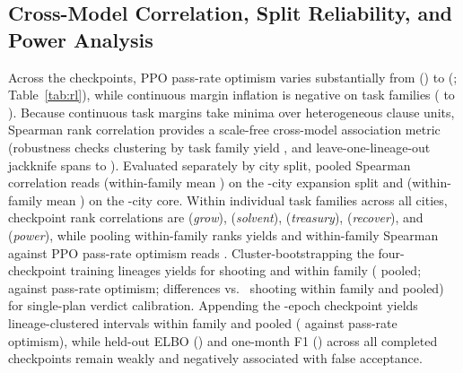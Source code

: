 \ifAcrossDone
\subsection{Cross-Model Correlation, Split Reliability, and Power Analysis}\label{app:acrossmore}

Across the \RlCkptsDone{} checkpoints, PPO pass-rate optimism varies substantially from \RlGapMin{} (\RlGapMinCkpt{}) to \RlGapMax{} (\RlGapMaxCkpt{}; Table~\ref{tab:rl}), while continuous margin inflation is negative on \AcInflNegN{} task families (\AcInflNegMin{} to \AcInflNegMax{}). Because continuous task margins take minima over heterogeneous clause units, Spearman rank correlation provides a scale-free cross-model association metric (robustness checks clustering by task family yield \AcRhoFamCI{}, and leave-one-lineage-out jackknife spans \AcLoloMin{} to \AcLoloMax{}). Evaluated separately by city split, pooled Spearman correlation reads \AcEightyRho{} \ci{\AcEightyRhoCI} (within-family mean \AcEightyWithin{}) on the \XCities-city expansion split and \AcFortyRho{} \ci{\AcFortyRhoCI} (within-family mean \AcFortyWithin{}) on the \HeldOutFamilies-city core. Within individual task families across all \AllCities{} cities, checkpoint rank correlations are \AcFamGrowRho{} \ci{\AcFamGrowRhoCI} (\emph{grow}), \AcFamSolvRho{} \ci{\AcFamSolvRhoCI} (\emph{solvent}), \AcFamTreasRho{} \ci{\AcFamTreasRhoCI} (\emph{treasury}), \AcFamRecovRho{} \ci{\AcFamRecovRhoCI} (\emph{recover}), and \AcFamPowerRho{} \ci{\AcFamPowerRhoCI} (\emph{power}), while pooling within-family ranks yields \AcRanked{} \ci{\AcRankedCI} and within-family Spearman against PPO pass-rate optimism reads \AcGapWithin{} \ci{\AcGapWithinCI}. Cluster-bootstrapping the \AcSixLineages{} four-checkpoint training lineages yields \ci{\AcShootInflRhoLinCI} for  shooting and \ci{\AcBOneInflWithinLinCI} within family (\ci{\AcBOneInflRhoLinCI} pooled; \AcEOneGapRho{} \ci{\AcEOneGapRhoCI} against pass-rate optimism; differences vs.\  shooting \AcETwoWithin{} \ci{\AcETwoWithinCI} within family and \AcETwo{} \ci{\AcETwoCI} pooled) for single-plan verdict calibration. Appending the \ExtTrEpochs-epoch checkpoint yields lineage-clustered intervals \ci{\ExtTrOosBOneWithinLinCI} within family and \ci{\ExtTrOosBOneRhoLinCI} pooled (\ExtTrOosBOneGapRho{} \ci{\ExtTrOosBOneGapRhoCI} against pass-rate optimism), while held-out ELBO (\ExtTrOosElboRho{}) and one-month F1 (\ExtTrOosFOneRho{}) across all \ExtTrOosFinals{} completed checkpoints remain weakly and negatively associated with  false acceptance.

